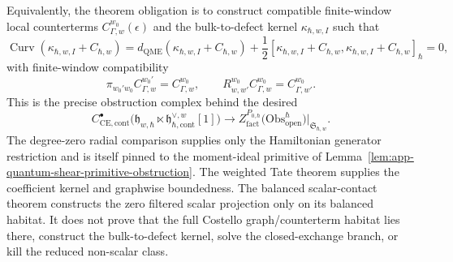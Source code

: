 \documentclass[11pt]{memoir}
\begin{document}
\begin{prob}
  Equivalently, the theorem obligation is to construct compatible
  finite-window local counterterms \(C_{\Gamma,w}^{w_0}(\epsilon)\) and
  the bulk-to-defect kernel \(\kappa_{\hbar,w,I}\) such that
  \[
    \operatorname{Curv}(\kappa_{\hbar,w,I}+C_{\hbar,w})
      =
      d_{\mathrm{QME}}(\kappa_{\hbar,w,I}+C_{\hbar,w})
      +\frac12[\kappa_{\hbar,w,I}+C_{\hbar,w},
        \kappa_{\hbar,w,I}+C_{\hbar,w}]_\hbar
      =0,
  \]
  with finite-window compatibility
  \[
    \pi_{w_0'w_0}C_{\Gamma,w}^{w_0'}=C_{\Gamma,w}^{w_0},\qquad
    R^{w_0}_{w,w'}C_{\Gamma,w}^{w_0}=C_{\Gamma,w'}^{w_0}.
  \]
  This is the precise obstruction complex behind the desired
  \[
    C^\bullet_{\mathrm{CE},\mathrm{cont}}\bigl(
      \mathfrak h_{w,\hbar}\ltimes
      \mathfrak h^{\vee,w}_{\hbar,\mathrm{cont}}[1]\bigr)
    \longrightarrow
    Z^{P_{0,\hbar}}_{\mathrm{fact}}
      \bigl(\mathrm{Obs}^\hbar_{\mathrm{open}}\bigr)|_{\mathfrak S_{\hbar,w}}.
  \]
  The degree-zero radial comparison supplies only the Hamiltonian
  generator restriction and is itself pinned to the moment-ideal
  primitive of
  Lemma~\ref{lem:app-quantum-shear-primitive-obstruction}.  The weighted
  Tate theorem supplies the coefficient kernel and graphwise
  boundedness.  The balanced scalar-contact theorem constructs the zero
  filtered scalar projection only on its balanced habitat.  It does not
  prove that the full Costello graph/counterterm habitat lies there,
  construct the bulk-to-defect kernel, solve the closed-exchange branch,
  or kill the reduced non-scalar class.
\end{prob}
\end{document}
